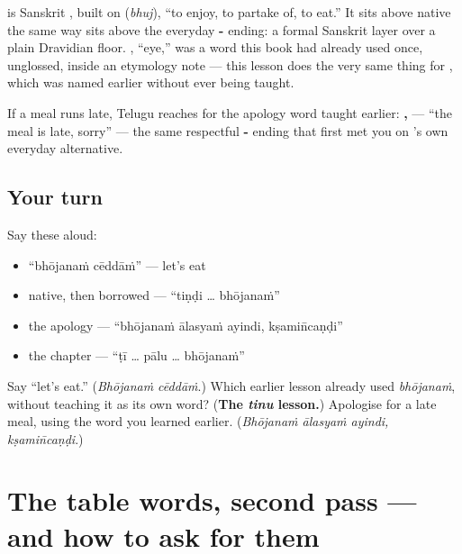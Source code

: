 \begin{cousinweb}
\textbf{} is Sanskrit \textbf{}, built on \textbf{} (\emph{bhuj}), \textquotedblleft{}to enjoy, to partake of, to eat.\textquotedblright{} It sits above native \textbf{} the same way \textbf{} sits above the everyday \textbf{-} ending: a formal Sanskrit layer over a plain Dravidian floor. \textbf{}, \textquotedblleft{}eye,\textquotedblright{} was a word this book had already used once, unglossed, inside an etymology note — this lesson does the very same thing for \textbf{}, which was named earlier without ever being taught.

If a meal runs late, Telugu reaches for the apology word taught earlier: \textbf{  , } — \textquotedblleft{}the meal is late, sorry\textquotedblright{} — the same respectful \textbf{-} ending that first met you on \textbf{}'s own everyday alternative.
\end{cousinweb}

\subsection*{Your turn}
Say these aloud:

\begin{itemize}
\raggedright
  \item \textquotedblleft{}bhōjanaṁ cēddāṁ\textquotedblright{} — let's eat
  \item native, then borrowed — \textquotedblleft{}tiṇḍi … bhōjanaṁ\textquotedblright{}
  \item the apology — \textquotedblleft{}bhōjanaṁ ālasyaṁ ayindi, kṣamin̄caṇḍi\textquotedblright{}
  \item the chapter — \textquotedblleft{}ṭī … pālu … bhōjanaṁ\textquotedblright{}
\end{itemize}

\begin{tcolorbox}[breakable,colback=teal!4,colframe=teal!35!black,title={Before you move on}]
Say \textquotedblleft{}let's eat.\textquotedblright{} (\emph{Bhōjanaṁ cēddāṁ}.) Which earlier lesson already used \emph{bhōjanaṁ}, without teaching it as its own word? (\textbf{The \emph{tinu} lesson.}) Apologise for a late meal, using the word you learned earlier. (\emph{Bhōjanaṁ ālasyaṁ ayindi, kṣamin̄caṇḍi}.)
\end{tcolorbox}
\section[(dialogue)]{The table words, second pass — and how to ask for them}

